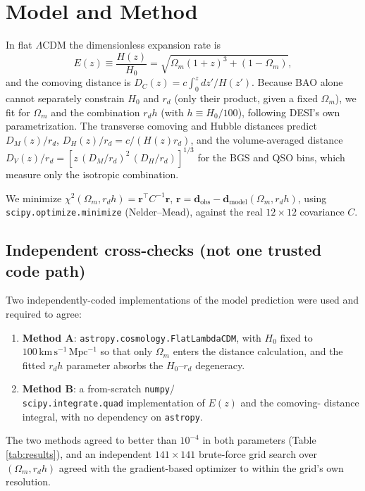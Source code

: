 \documentclass[11pt]{article}
\begin{document}
\section{Model and Method}

In flat $\Lambda$CDM the dimensionless expansion rate is
\begin{equation}
E(z) \equiv \frac{H(z)}{H_0} = \sqrt{\Omega_m(1+z)^3 + (1-\Omega_m)},
\end{equation}
and the comoving distance is $D_C(z) = c\int_0^z dz'/H(z')$. Because BAO
alone cannot separately constrain $H_0$ and $r_d$ (only their product, given
a fixed $\Omega_m$), we fit for $\Omega_m$ and the combination $r_d h$
(with $h\equiv H_0/100$), following DESI's own parametrization. The
transverse comoving and Hubble distances predict
$D_M(z)/r_d$, $D_H(z)/r_d = c/(H(z)r_d)$, and the volume-averaged distance
$D_V(z)/r_d = [z\,(D_M/r_d)^2\,(D_H/r_d)]^{1/3}$ for the BGS and QSO bins,
which measure only the isotropic combination.

We minimize
$\chi^2(\Omega_m, r_d h) = \mathbf{r}^\top C^{-1} \mathbf{r}$,
$\mathbf{r} = \mathbf{d}_\text{obs} - \mathbf{d}_\text{model}(\Omega_m, r_d h)$,
using \texttt{scipy.optimize.minimize} (Nelder--Mead), against the real
$12\times12$ covariance $C$.

\subsection{Independent cross-checks (not one trusted code path)}

Two independently-coded implementations of the model prediction were used
and required to agree:

\begin{enumerate}
\item \textbf{Method A}: \texttt{astropy.cosmology.FlatLambdaCDM}, with
$H_0$ fixed to $100\,\mathrm{km\,s^{-1}\,Mpc^{-1}}$ so that only $\Omega_m$
enters the distance calculation, and the fitted $r_d h$ parameter absorbs
the $H_0$--$r_d$ degeneracy.
\item \textbf{Method B}: a from-scratch \texttt{numpy}/\\
\texttt{scipy.integrate.quad} implementation of $E(z)$ and the comoving-
distance integral, with no dependency on \texttt{astropy}.
\end{enumerate}

The two methods agreed to better than $10^{-4}$ in both parameters (Table
\ref{tab:results}), and an independent $141\times141$ brute-force grid
search over $(\Omega_m, r_d h)$ agreed with the gradient-based optimizer to
within the grid's own resolution.
\end{document}
